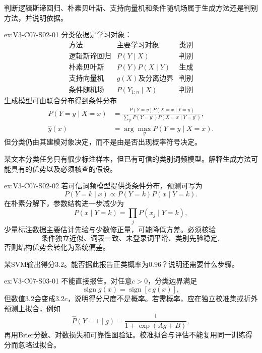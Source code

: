 \begin{SLChapterExercisePairSection}
\begin{exercise}\label{ex:V3-C07-S02-01}
判断逻辑斯谛回归、朴素贝叶斯、支持向量机和条件随机场属于生成方法还是判别方法，并说明依据。
\end{exercise}
\ifSLFullEdition
{}\label{sol:V3-C07-S02-01}
\begin{chapterexercisesolution}{ex:V3-C07-S02-01}
分类依据是学习对象：
\[
\begin{array}{c|c|c}
\text{方法}&\text{主要学习对象}&\text{类别}\\ \hline
\text{逻辑斯谛回归}&P(Y\mid X)&\text{判别}\\
\text{朴素贝叶斯}&P(Y)P(X\mid Y)&\text{生成}\\
\text{支持向量机}&g(X)\text{及分离边界}&\text{判别}\\
\text{条件随机场}&P(Y_{1:n}\mid X)&\text{判别}
\end{array}
\]
生成模型可由联合分布得到条件分布
\[
\begin{aligned}
P(Y=y\mid X=x)
  &=\frac{P(Y=y)P(X=x\mid Y=y)}{\sum_{y'}P(Y=y')P(X=x\mid Y=y')},\\
\widehat y(x)
  &=\arg\max_y P(Y=y\mid X=x).
\end{aligned}
\]
但分类仍由其建模对象决定，而不是由是否出现概率符号决定。
\end{chapterexercisesolution}
\fi

\begin{exercise}\label{ex:V3-C07-S02-02}
某文本分类任务只有很少标注样本，但已有可信的类别词频模型。解释生成方法可能具有的优势以及必须核查的假设。
\end{exercise}
\ifSLFullEdition
{}\label{sol:V3-C07-S02-02}
\begin{chapterexercisesolution}{ex:V3-C07-S02-02}
若可信词频模型提供类条件分布，预测可写为
\[
P(Y=k\mid x)
\propto P(Y=k)P(x\mid Y=k).
\]
在朴素分解下，参数结构进一步减少为
\[
P(x\mid Y=k)=\prod_{j}P(x_j\mid Y=k),
\]
少量标注数据主要估计先验与少数修正量，可能降低方差。必须核验
\[
\text{条件独立近似、词表一致、未登录词平滑、类别先验稳定},
\]
否则结构优势会转化为系统偏差。
\end{chapterexercisesolution}
\fi

\begin{exercise}\label{ex:V3-C07-S03-01}
某SVM输出得分$3.2$。能否据此报告正类概率为$0.96$？说明还需要什么步骤。
\end{exercise}
\ifSLFullEdition
{}\label{sol:V3-C07-S03-01}
\begin{chapterexercisesolution}{ex:V3-C07-S03-01}
不能直接报告。对任意$c>0$，分类边界满足
\[
\operatorname{sign}g(x)=\operatorname{sign}[c\,g(x)],
\]
但数值$3.2$会变成$3.2c$，说明得分尺度不是概率。若需概率，应在独立校准集或折外预测上拟合，例如
\[
\widehat P(Y=1\mid g)
=\frac1{1+\exp(Ag+B)},
\]
再用Brier分数、对数损失和可靠性图验证。校准拟合与评估不能复用同一训练得分而忽略过拟合。
\end{chapterexercisesolution}
\fi


\end{SLChapterExercisePairSection}

